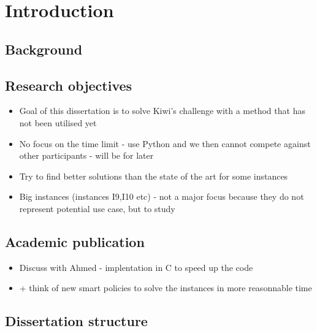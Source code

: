 \chapter{Introduction}
\label{Chapter1}



\section{Background}

\section{Research objectives}

\begin{itemize}
    \item Goal of this dissertation is to solve Kiwi's challenge with a method that has not been utilised yet
    \item No focus on the time limit - use Python and we then cannot compete against other participants - will be for later
    \item Try to find better solutions than the state of the art for some instances
    \item Big instances (instances I9,I10 etc) - not a major focus because they do not represent potential use case, but to study
\end{itemize}

\section{Academic publication}
\begin{itemize}
    \item Discuss with Ahmed - implentation in C to speed up the code
    \item + think of new smart policies to solve the instances in more reasonnable time
\end{itemize}

\section{Dissertation structure}